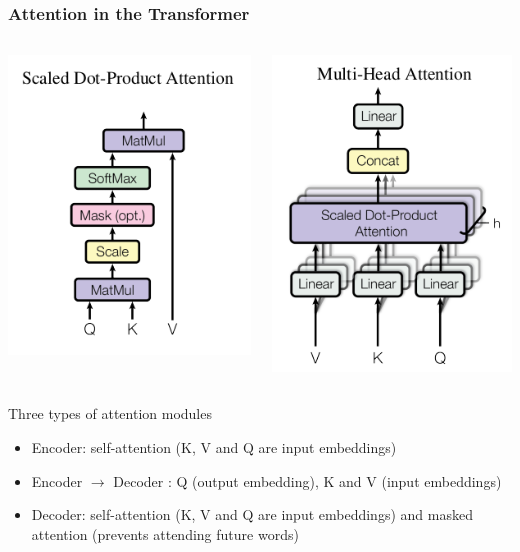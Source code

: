 \documentclass[10pt]{beamer}
\begin{document}
\begin{frame}
  \frametitle{Attention in the Transformer}

  \begin{columns}
\begin{center}
	\includegraphics[width=.55\columnwidth]{images/att1}
\end{center}
\begin{center}
	\includegraphics[width=.47\columnwidth]{images/att2}
\end{center}
    \end{columns}
Three types of attention modules
\begin{itemize}
\item Encoder: self-attention (K, V and Q are input embeddings) 
\item Encoder $\rightarrow$ Decoder : Q (output embedding), K and V (input embeddings) 
\item Decoder: self-attention (K, V and Q are input embeddings)
and masked attention (prevents attending future words)
\end{itemize}

\end{frame}
\end{document}
